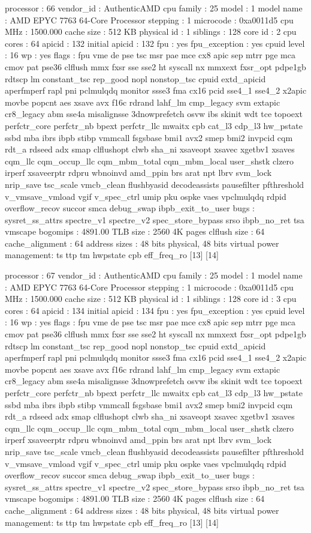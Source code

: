 processor	: 66
vendor_id	: AuthenticAMD
cpu family	: 25
model		: 1
model name	: AMD EPYC 7763 64-Core Processor
stepping	: 1
microcode	: 0xa0011d5
cpu MHz		: 1500.000
cache size	: 512 KB
physical id	: 1
siblings	: 128
core id		: 2
cpu cores	: 64
apicid		: 132
initial apicid	: 132
fpu		: yes
fpu_exception	: yes
cpuid level	: 16
wp		: yes
flags		: fpu vme de pse tsc msr pae mce cx8 apic sep mtrr pge mca cmov pat pse36 clflush mmx fxsr sse sse2 ht syscall nx mmxext fxsr_opt pdpe1gb rdtscp lm constant_tsc rep_good nopl nonstop_tsc cpuid extd_apicid aperfmperf rapl pni pclmulqdq monitor ssse3 fma cx16 pcid sse4_1 sse4_2 x2apic movbe popcnt aes xsave avx f16c rdrand lahf_lm cmp_legacy svm extapic cr8_legacy abm sse4a misalignsse 3dnowprefetch osvw ibs skinit wdt tce topoext perfctr_core perfctr_nb bpext perfctr_llc mwaitx cpb cat_l3 cdp_l3 hw_pstate ssbd mba ibrs ibpb stibp vmmcall fsgsbase bmi1 avx2 smep bmi2 invpcid cqm rdt_a rdseed adx smap clflushopt clwb sha_ni xsaveopt xsavec xgetbv1 xsaves cqm_llc cqm_occup_llc cqm_mbm_total cqm_mbm_local user_shstk clzero irperf xsaveerptr rdpru wbnoinvd amd_ppin brs arat npt lbrv svm_lock nrip_save tsc_scale vmcb_clean flushbyasid decodeassists pausefilter pfthreshold v_vmsave_vmload vgif v_spec_ctrl umip pku ospke vaes vpclmulqdq rdpid overflow_recov succor smca debug_swap ibpb_exit_to_user
bugs		: sysret_ss_attrs spectre_v1 spectre_v2 spec_store_bypass srso ibpb_no_ret tsa vmscape
bogomips	: 4891.00
TLB size	: 2560 4K pages
clflush size	: 64
cache_alignment	: 64
address sizes	: 48 bits physical, 48 bits virtual
power management: ts ttp tm hwpstate cpb eff_freq_ro [13] [14]

processor	: 67
vendor_id	: AuthenticAMD
cpu family	: 25
model		: 1
model name	: AMD EPYC 7763 64-Core Processor
stepping	: 1
microcode	: 0xa0011d5
cpu MHz		: 1500.000
cache size	: 512 KB
physical id	: 1
siblings	: 128
core id		: 3
cpu cores	: 64
apicid		: 134
initial apicid	: 134
fpu		: yes
fpu_exception	: yes
cpuid level	: 16
wp		: yes
flags		: fpu vme de pse tsc msr pae mce cx8 apic sep mtrr pge mca cmov pat pse36 clflush mmx fxsr sse sse2 ht syscall nx mmxext fxsr_opt pdpe1gb rdtscp lm constant_tsc rep_good nopl nonstop_tsc cpuid extd_apicid aperfmperf rapl pni pclmulqdq monitor ssse3 fma cx16 pcid sse4_1 sse4_2 x2apic movbe popcnt aes xsave avx f16c rdrand lahf_lm cmp_legacy svm extapic cr8_legacy abm sse4a misalignsse 3dnowprefetch osvw ibs skinit wdt tce topoext perfctr_core perfctr_nb bpext perfctr_llc mwaitx cpb cat_l3 cdp_l3 hw_pstate ssbd mba ibrs ibpb stibp vmmcall fsgsbase bmi1 avx2 smep bmi2 invpcid cqm rdt_a rdseed adx smap clflushopt clwb sha_ni xsaveopt xsavec xgetbv1 xsaves cqm_llc cqm_occup_llc cqm_mbm_total cqm_mbm_local user_shstk clzero irperf xsaveerptr rdpru wbnoinvd amd_ppin brs arat npt lbrv svm_lock nrip_save tsc_scale vmcb_clean flushbyasid decodeassists pausefilter pfthreshold v_vmsave_vmload vgif v_spec_ctrl umip pku ospke vaes vpclmulqdq rdpid overflow_recov succor smca debug_swap ibpb_exit_to_user
bugs		: sysret_ss_attrs spectre_v1 spectre_v2 spec_store_bypass srso ibpb_no_ret tsa vmscape
bogomips	: 4891.00
TLB size	: 2560 4K pages
clflush size	: 64
cache_alignment	: 64
address sizes	: 48 bits physical, 48 bits virtual
power management: ts ttp tm hwpstate cpb eff_freq_ro [13] [14]

